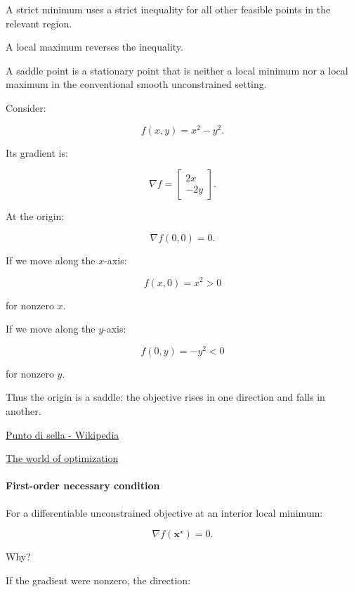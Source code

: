 A strict minimum uses a strict inequality for all other feasible points in the relevant region.

A local maximum reverses the inequality.

A saddle point is a stationary point that is neither a local minimum nor a local maximum in the conventional smooth unconstrained setting.

Consider:

\[
f(x,y)=x^2-y^2.
\]

Its gradient is:

\[
\nabla f= \begin{bmatrix} 2x\\-2y \end{bmatrix}.
\]

At the origin:

\[
\nabla f(0,0)=0.
\]

If we move along the \(x\)-axis:

\[
f(x,0)=x^2>0
\]

for nonzero \(x\).

If we move along the \(y\)-axis:

\[
f(0,y)=-y^2<0
\]

for nonzero \(y\).

Thus the origin is a saddle: the objective rises in one direction and falls in another.

\href{https://images.openai.com/static-rsc-4/IqMqjdabbXp9lgF1Y59BWcBJuurZz0BV9d1Mv_AppeNOVYVoRQPuuV61Cf6TJAGqRi-DqMXoElE3-r5maVwHTXuo83A0mjM4FaBadvF4zNjF2LeOOzMjujVpT69hboVYADw65CSdRZt7hW_eNVx2xfRet5TkDNIoAwZTLnVQSgY?purpose=inline}{Punto di sella - Wikipedia}

\href{https://images.openai.com/static-rsc-4/2hdI6qSb-Gmq24hva1IPzdMch7SbSaYVsYlCAepKmsA3SZDPddxqa6DCww0y-FyOpM9G78ABWGxf3MsZs07Pfn1BlWk34xJqOTG0ScUe2i3GJrc8HXVjsf5kBDzuZpsfQjpbPkJbrEk2b-r1gAKcleVv-hPxqzAz9Qwbl9J2BsI?purpose=inline}{The world of optimization}

\paragraph{First-order necessary condition}\label{02-foundations-ii-ch026-first-order-necessary-condition}

For a differentiable unconstrained objective at an interior local minimum:

\[
\boxed{\nabla f(\mathbf x^\star)=0}.
\]

Why?

If the gradient were nonzero, the direction:

